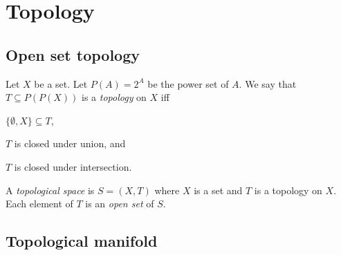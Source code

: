 \chapter{Topology}

\section{Open set topology}

Let \(X\) be a set.
Let \(P(A) = 2^A\) be the power set of \(A\).
We say that \(T \subseteq P(P(X))\) is a \emph{topology} on \(X\) iff
\begin{enumerate*}[label={(\arabic*)}]
    \item \(\{ \emptyset, X \} \subseteq T\),
    \item \(T\) is closed under union, and
    \item \(T\) is closed under intersection.
\end{enumerate*}

A \emph{topological space} is \(S = (X,T)\) where \(X\) is a set and \(T\) is a topology on \(X\).
Each element of \(T\) is an \emph{open set} of \(S\).

\section{Topological manifold}




